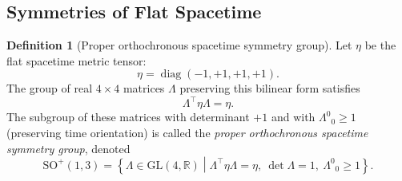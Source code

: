 \documentclass{amsart}
\theoremstyle{definition}
\newtheorem{definition}[theorem]{Definition}
\theoremstyle{remark}
\DeclareMathOperator{\diag}{diag}
\begin{document}
\subsection{Symmetries of Flat Spacetime}
\label{subsec:so13_group}
\begin{definition}[Proper orthochronous spacetime symmetry group]
  Let $\eta$ be the flat spacetime metric tensor:
  \begin{equation*}
    \eta = \diag(-1, +1, +1, +1).
  \end{equation*}
  The group of real $4 \times 4$ matrices $\Lambda$ preserving this bilinear form satisfies
  \begin{equation*}
    \Lambda^\top \eta \Lambda = \eta.
  \end{equation*}
  The subgroup of these matrices with determinant $+1$ and with $\Lambda^0{}_0 \geq 1$ (preserving time orientation) is called the \emph{proper orthochronous spacetime symmetry group}, denoted
  \begin{equation*}
    \mathrm{SO}^+(1,3) = \left\{ \Lambda \in \mathrm{GL}(4,\mathbb{R}) \middle|
    \Lambda^\top \eta \Lambda = \eta,\ \det \Lambda = 1,\ \Lambda^0{}_0 \geq 1 \right\}.
  \end{equation*}
\end{definition}
\end{document}
